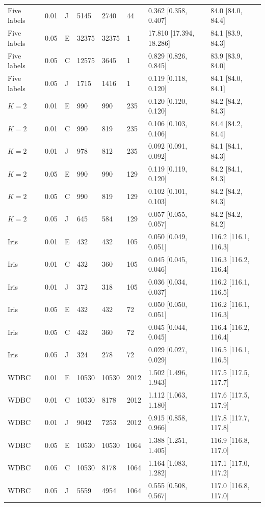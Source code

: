 \begin{tabular}{llllllll}
Five labels & 0.01 & J & 5145 & 2740 & 44 & 0.362 [0.358, 0.407] & 84.0 [84.0, 84.4] \\
Five labels & 0.05 & E & 32375 & 32375 & 1 & 17.810 [17.394, 18.286] & 84.1 [83.9, 84.3] \\
Five labels & 0.05 & C & 12575 & 3645 & 1 & 0.829 [0.826, 0.845] & 83.9 [83.9, 84.0] \\
Five labels & 0.05 & J & 1715 & 1416 & 1 & 0.119 [0.118, 0.120] & 84.1 [84.0, 84.1] \\
$K=2$ & 0.01 & E & 990 & 990 & 235 & 0.120 [0.120, 0.120] & 84.2 [84.2, 84.3] \\
$K=2$ & 0.01 & C & 990 & 819 & 235 & 0.106 [0.103, 0.106] & 84.4 [84.2, 84.4] \\
$K=2$ & 0.01 & J & 978 & 812 & 235 & 0.092 [0.091, 0.092] & 84.1 [84.1, 84.3] \\
$K=2$ & 0.05 & E & 990 & 990 & 129 & 0.119 [0.119, 0.120] & 84.2 [84.1, 84.3] \\
$K=2$ & 0.05 & C & 990 & 819 & 129 & 0.102 [0.101, 0.103] & 84.2 [84.2, 84.3] \\
$K=2$ & 0.05 & J & 645 & 584 & 129 & 0.057 [0.055, 0.057] & 84.2 [84.2, 84.2] \\
Iris & 0.01 & E & 432 & 432 & 105 & 0.050 [0.049, 0.051] & 116.2 [116.1, 116.3] \\
Iris & 0.01 & C & 432 & 360 & 105 & 0.045 [0.045, 0.046] & 116.3 [116.2, 116.4] \\
Iris & 0.01 & J & 372 & 318 & 105 & 0.036 [0.034, 0.037] & 116.2 [116.1, 116.5] \\
Iris & 0.05 & E & 432 & 432 & 72 & 0.050 [0.050, 0.051] & 116.2 [116.1, 116.3] \\
Iris & 0.05 & C & 432 & 360 & 72 & 0.045 [0.044, 0.045] & 116.4 [116.2, 116.4] \\
Iris & 0.05 & J & 324 & 278 & 72 & 0.029 [0.027, 0.029] & 116.5 [116.1, 116.5] \\
WDBC & 0.01 & E & 10530 & 10530 & 2012 & 1.502 [1.496, 1.943] & 117.5 [117.5, 117.7] \\
WDBC & 0.01 & C & 10530 & 8178 & 2012 & 1.112 [1.063, 1.180] & 117.6 [117.5, 117.9] \\
WDBC & 0.01 & J & 9042 & 7253 & 2012 & 0.915 [0.858, 0.966] & 117.8 [117.7, 117.8] \\
WDBC & 0.05 & E & 10530 & 10530 & 1064 & 1.388 [1.251, 1.405] & 116.9 [116.8, 117.0] \\
WDBC & 0.05 & C & 10530 & 8178 & 1064 & 1.164 [1.083, 1.282] & 117.1 [117.0, 117.2] \\
WDBC & 0.05 & J & 5559 & 4954 & 1064 & 0.555 [0.508, 0.567] & 117.0 [116.8, 117.0] \\
\end{tabular}

